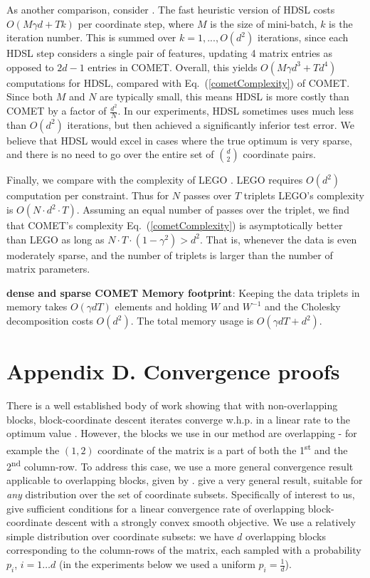 \documentclass[twoside,11pt]{article}
\newcommand\mat[1]{{#1}}
\newcommand{\W}{\mat{W}}
\renewcommand{\eqref}[1]{Eq.~(\ref{#1})}
\begin{document}
As another comparison, consider \citet{HDSL}. The fast heuristic version of HDSL costs $O(M\gamma d+Tk)$ per coordinate step, where $M$ is the size of mini-batch, $k$ is the iteration number. This is summed over $k=1,...,O(d^2)$ iterations, since each HDSL step considers a single pair of features, updating 4 matrix entries as opposed to $2d-1$ entries in COMET. Overall, this yields $O(M\gamma d^3+Td^4)$ computations for HDSL, compared with \eqref{cometComplexity} of COMET. Since both $M$ and $N$ are typically small, this means HDSL is more costly than COMET by a factor of $\frac{d^2}{N}$. In our experiments, HDSL sometimes uses much less than $O(d^2)$ iterations, but then achieved a significantly inferior test error. We believe that HDSL would excel in cases where the true optimum is very sparse, and there is no need to go over the entire set of $d \choose 2$ coordinate pairs.

Finally, we compare with the complexity of LEGO \citep{lego}. LEGO requires $O(d^2)$ computation per constraint. Thus for $N$ passes over $T$ triplets LEGO's complexity is $O(N\cdot d^2 \cdot T)$. Assuming an equal number of passes over the triplet, we find that COMET's complexity \eqref{cometComplexity} is asymptotically better than LEGO as long as $N \cdot T \cdot (1-\gamma^2) > d^2$. That is, whenever the data is even moderately sparse, and the number of triplets is larger than the number of matrix parameters.

{\bf dense and sparse COMET Memory footprint}: Keeping the data triplets in memory takes $O(\gamma d T)$ elements and holding $\W$ and $\W^{-1}$ and the Cholesky decomposition costs $O(d^2)$. The total memory usage is $O(\gamma d T + d^2)$. 

\section*{Appendix D. Convergence proofs}
There is a well established body of work showing that with non-overlapping blocks, block-coordinate descent iterates converge w.h.p. in a linear rate to the optimum value \citep{nesterov2012efficiency,richtarik2014iteration}.
However, the blocks we use in our method are overlapping - for example the $(1,2)$ coordinate of the matrix is a part of both the 1\textsuperscript{st} and the 2\textsuperscript{nd} column-row. To address this case, we use a more general convergence result applicable to overlapping blocks, given by \citet{richtarik2013optimal}. \citeauthor{richtarik2013optimal} give a very general result, suitable for \emph{any} distribution over the set of coordinate subsets. 
Specifically of interest to us, \citeauthor{richtarik2013optimal} give sufficient conditions for a linear convergence rate of overlapping block-coordinate descent with a strongly convex smooth objective. 
We use a relatively simple distribution over coordinate subsets: we have $d$ overlapping blocks corresponding to the column-rows of the matrix, each sampled with a probability $p_i$, $i=1 \ldots d$ (in the experiments below we used a uniform $p_i = \frac{1}{d}$).
\end{document}
